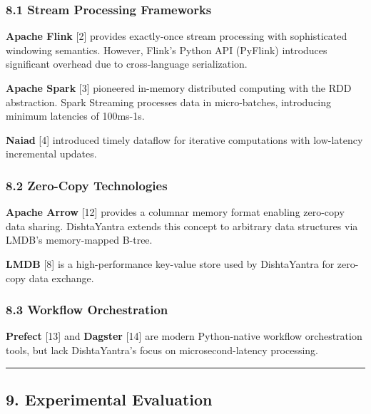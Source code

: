 \documentclass[
]{article}
\begin{document}
\hypertarget{stream-processing-frameworks}{%
\subsubsection{8.1 Stream Processing
Frameworks}\label{stream-processing-frameworks}}

\textbf{Apache Flink} {[}2{]} provides exactly-once stream processing
with sophisticated windowing semantics. However, Flink's Python API
(PyFlink) introduces significant overhead due to cross-language
serialization.

\textbf{Apache Spark} {[}3{]} pioneered in-memory distributed computing
with the RDD abstraction. Spark Streaming processes data in
micro-batches, introducing minimum latencies of 100ms-1s.

\textbf{Naiad} {[}4{]} introduced timely dataflow for iterative
computations with low-latency incremental updates.

\hypertarget{zero-copy-technologies}{%
\subsubsection{8.2 Zero-Copy
Technologies}\label{zero-copy-technologies}}

\textbf{Apache Arrow} {[}12{]} provides a columnar memory format
enabling zero-copy data sharing. DishtaYantra extends this concept to
arbitrary data structures via LMDB's memory-mapped B-tree.

\textbf{LMDB} {[}8{]} is a high-performance key-value store used by
DishtaYantra for zero-copy data exchange.

\hypertarget{workflow-orchestration}{%
\subsubsection{8.3 Workflow
Orchestration}\label{workflow-orchestration}}

\textbf{Prefect} {[}13{]} and \textbf{Dagster} {[}14{]} are modern
Python-native workflow orchestration tools, but lack DishtaYantra's
focus on microsecond-latency processing.

\begin{center}\rule{0.5\linewidth}{0.5pt}\end{center}

\hypertarget{experimental-evaluation}{%
\subsection{9. Experimental Evaluation}\label{experimental-evaluation}}
\end{document}
